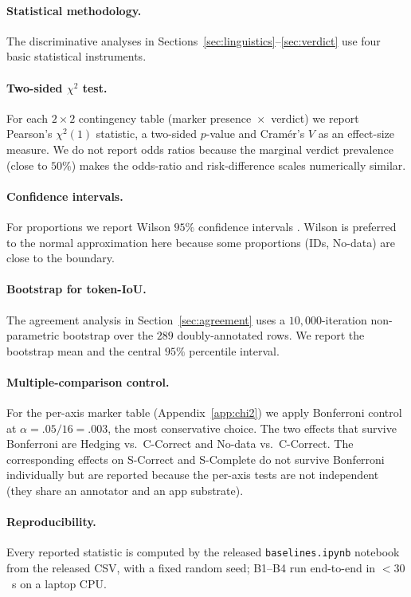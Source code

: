 \documentclass[11pt,a4paper]{article}
\begin{document}
\paragraph{Statistical methodology.}\label{sec:method}
The discriminative analyses in Sections~\ref{sec:linguistics}--\ref{sec:verdict}
use four basic statistical instruments.

\paragraph{Two-sided $\chi^{2}$ test.} For each $2{\times}2$
contingency table (marker presence~$\times$~verdict) we report
Pearson's $\chi^{2}(1)$ statistic, a two-sided $p$-value and
Cram\'{e}r's $V$ as an effect-size measure. We do not report
odds ratios because the marginal verdict prevalence (close to
$50\%$) makes the odds-ratio and risk-difference scales numerically
similar.

\paragraph{Confidence intervals.}
For proportions we report Wilson $95\%$ confidence intervals
\citep{cohen1960coefficient,landis1977measurement}. Wilson is
preferred to the normal approximation here because some proportions
(IDs, No-data) are close to the boundary.

\paragraph{Bootstrap for token-IoU.}
The agreement analysis in Section~\ref{sec:agreement} uses a
$10{,}000$-iteration non-parametric bootstrap over the $289$
doubly-annotated rows. We report the bootstrap mean and the central
$95\%$ percentile interval.

\paragraph{Multiple-comparison control.}
For the per-axis marker table (Appendix~\ref{app:chi2}) we apply
Bonferroni control at $\alpha=.05/16=.003$, the most conservative
choice. The two effects that survive Bonferroni are Hedging vs.\
C-Correct and No-data vs.\ C-Correct. The corresponding effects on
S-Correct and S-Complete do not survive Bonferroni individually but
are reported because the per-axis tests are not independent (they
share an annotator and an app substrate).

\paragraph{Reproducibility.}
Every reported statistic is computed by the released
\texttt{baselines.ipynb} notebook from the released CSV, with a
fixed random seed; B1--B4 run end-to-end in $<30$~s on a laptop CPU.
\end{document}
